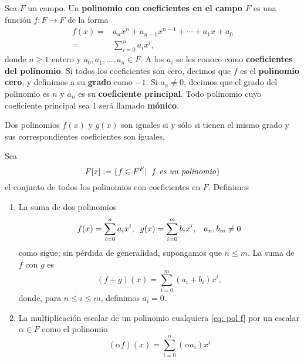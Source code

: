 \begin{ej}
Sea $F$ un campo. Un \textbf{polinomio con coeficientes en el campo $F$}
es una función $f : F \longrightarrow F$ de la forma
\begin{align}
	\label{eq: pol f}
f(x) = & a_{n}x^{n} + a_{n-1}x^{n-1} + \cdots + a_{1}x + a_{0} \nonumber \\
= & \sum_{i=0}^{n} a_{i}x^{i},  
\end{align}
donde $n \geq 1$ entero y $a_{0}, a_{1}, \ldots , a_{n} \in F$. 
A los $a_{i}$ se les conoce como
\textbf{coeficientes del polinomio}. Si todos los coeficientes
son cero, decimos que $f$ es el \textbf{polinomio cero}, 
y definimos a su \textbf{grado} como $-1$.
Si $a_{n} \neq 0$, decimos que el grado del polinomio
es $n$ y $a_{n}$ es su \textbf{coeficiente principal}.
Todo polinomio cuyo coeficiente principal sea $1$ será llamado
\textbf{mónico}.

Dos polinomios $f(x)$ y $g(x)$ son iguales si y sólo si 
tienen el mismo grado y sus correspondientes coeficientes
son iguales.

Sea
\[
F[x] := \{ f \in F^{F}  | \hspace{0.2cm} f \textit{ es un polinomio} \}
\]
el conjunto de todos los polinomios con coeficientes en $F$.
Definimos 
\begin{enumerate}
	\item La suma de dos polinomios
	\[
	f(x) = \sum_{i=0}^{n} a_{i}x^{i},
	\hspace{0.2cm}
	g(x) = \sum_{i=0}^{m} b_{i}x^{i},
	\hspace{0.3cm} a_{n}, b_{m} \neq 0
	\]
	como sigue; sin pérdida de generalidad, supongamos que
	$n \leq m$. La suma de $f$ con $g$ es
	\[
	(f+g)(x) = \sum_{i=0}^{m} (a_{i} + b_{i}) x^{i},
	\]
	donde, para $n \leq i \leq m$, definimos $a_{i} = 0$.
	
	\item La multiplicación escalar de un polinomio cualquiera
	\eqref{eq: pol f} por un escalar $\alpha \in F$ como
	el polinomio
	\[
	(\alpha f )(x) = \sum_{i=0}^{n} (\alpha a_{i}) x^{i}
	\]
\end{enumerate}



\end{ej}
